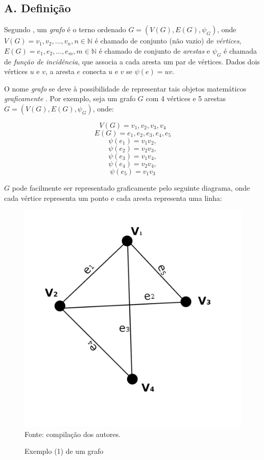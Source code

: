 \documentclass[twocolumn, 10pt]{extarticle}
\begin{document}
\subsection*{A. \quad Definição}

Segundo \cite[p. 1]{bondy}, um \textit{grafo} é o terno ordenado $G = (V(G), E(G), \psi_G)$, onde $V(G) = {v_1, v_2,\dots,v_n}, n \in \mathbb{N}$ é chamado de conjunto (não vazio) de \textit{vértices}, $E(G) = {e_1, e_2,\dots,e_m}, m \in \mathbb{N}$ é chamado de conjunto de \textit{arestas} e $\psi_G$ é chamada de \textit{função de incidência}, que associa a cada aresta um par de vértices. Dados dois vértices $u$ e $v$, a aresta $e$ conecta $u$ e $v$ se $\psi(e) = uv$. 

O nome \textit{grafo} se deve à possibilidade de representar tais objetos matemáticos \textit{graficamente} \cite[p. 2]{bondy}. Por exemplo, seja um grafo $G$ com 4 vértices e 5 arestas $G = (V(G), E(G), \psi_G)$, onde:

\[
V(G) = {v_1, v_2, v_3, v_4}
\]
\[
E(G) = {e_1, e_2, e_3, e_4, e_5}
\]
\[
\psi(e_1) = v_1v_2,\]
\[
\psi(e_2) = v_2v_3, 
\]
\[
\psi(e_3) = v_1v_4,
\]
\[
\psi(e_4) = v_2v_4, 
\]
\[
\psi(e_5) = v_1v_3
\]

$G$ pode facilmente ser representado graficamente pelo seguinte diagrama, onde cada vértice representa um ponto e cada aresta representa uma linha:

\begin{figure}[H]
	\caption{Exemplo (1) de um grafo} 
	\centering
	\includegraphics[scale=0.7]{grafo1}
	\\ Fonte: compilação dos autores.
\end{figure}
\end{document}

